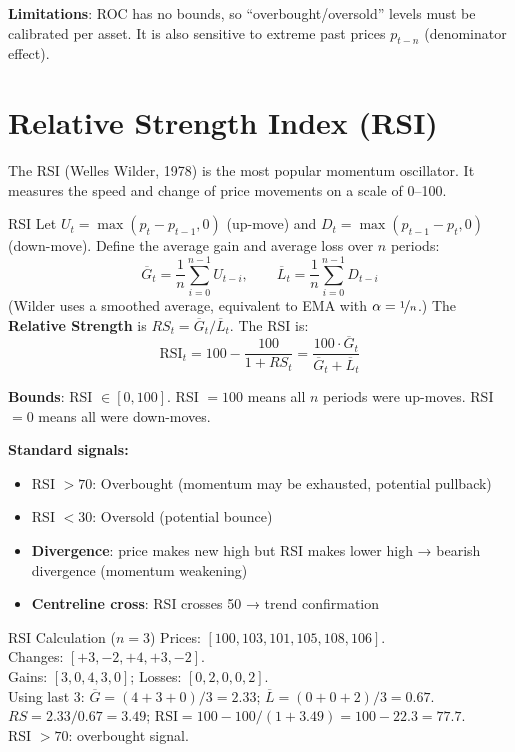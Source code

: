 \documentclass[12pt,a4paper,openany]{report}
\theoremstyle{definition}
\begin{document}
\textbf{Limitations}: ROC has no bounds, so ``overbought/oversold'' levels must be calibrated per asset. It is also sensitive to extreme past prices $p_{t-n}$ (denominator effect).

\section{Relative Strength Index (RSI)}

The RSI (Welles Wilder, 1978) is the most popular momentum oscillator. It measures the speed and change of price movements on a scale of 0--100.

\begin{definitionbox}{RSI}
Let $U_t = \max(p_t - p_{t-1}, 0)$ (up-move) and $D_t = \max(p_{t-1} - p_t, 0)$ (down-move). Define the average gain and average loss over $n$ periods:
\[
  \overline{G}_t = \frac{1}{n}\sum_{i=0}^{n-1} U_{t-i}, \qquad \overline{L}_t = \frac{1}{n}\sum_{i=0}^{n-1} D_{t-i}
\]
(Wilder uses a smoothed average, equivalent to EMA with $\alpha = \nicefrac{1}{n}$.) The \textbf{Relative Strength} is $RS_t = \overline{G}_t / \overline{L}_t$. The RSI is:
\[
  \text{RSI}_t = 100 - \frac{100}{1 + RS_t} = \frac{100 \cdot \overline{G}_t}{\overline{G}_t + \overline{L}_t}
\]
\end{definitionbox}

\textbf{Bounds}: RSI $\in [0, 100]$. RSI $= 100$ means all $n$ periods were up-moves. RSI $= 0$ means all were down-moves.

\textbf{Standard signals:}
\begin{itemize}
  \item RSI $> 70$: Overbought (momentum may be exhausted, potential pullback)
  \item RSI $< 30$: Oversold (potential bounce)
  \item \textbf{Divergence}: price makes new high but RSI makes lower high → bearish divergence (momentum weakening)
  \item \textbf{Centreline cross}: RSI crosses 50 → trend confirmation
\end{itemize}

\begin{examplebox}{RSI Calculation ($n = 3$)}
Prices: $[100, 103, 101, 105, 108, 106]$. \\
Changes: $[+3, -2, +4, +3, -2]$. \\
Gains: $[3, 0, 4, 3, 0]$; Losses: $[0, 2, 0, 0, 2]$. \\
Using last 3: $\overline{G} = (4+3+0)/3 = 2.33$; $\overline{L} = (0+0+2)/3 = 0.67$. \\
$RS = 2.33/0.67 = 3.49$; $\text{RSI} = 100 - 100/(1+3.49) = 100 - 22.3 = 77.7$. \\
RSI $> 70$: overbought signal.
\end{examplebox}
\end{document}
